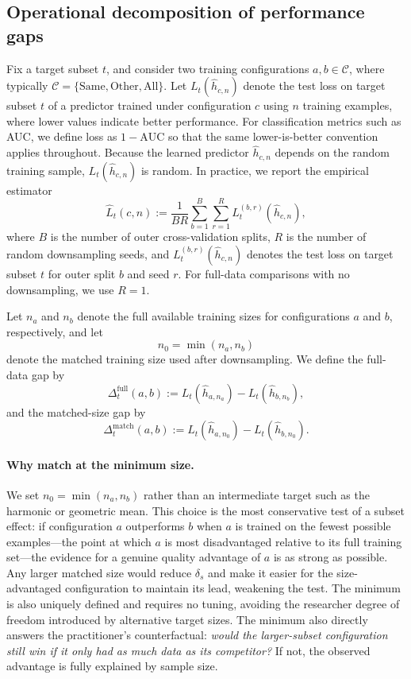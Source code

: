 \documentclass{article}
\begin{document}
\subsection{Operational decomposition of performance gaps}
Fix a target subset $t$, and consider two training configurations $a,b \in \mathcal C$, where typically
$\mathcal C=\{\mathrm{Same},\mathrm{Other},\mathrm{All}\}$.
Let $L_t(\hat h_{c,n})$ denote the test loss on target subset $t$ of a predictor trained under configuration $c$ using $n$ training examples, where lower values indicate better performance.
For classification metrics such as AUC, we define loss as $1-\mathrm{AUC}$ so that the same lower-is-better convention applies throughout.
Because the learned predictor $\hat h_{c,n}$ depends on the random training sample, $L_t(\hat h_{c,n})$ is random.
In practice, we report the empirical estimator
\begin{equation}
\widehat{L}_t(c,n)
:=
\frac{1}{BR}\sum_{b=1}^B \sum_{r=1}^R L_t^{(b,r)}(\hat h_{c,n}),
\label{eq:empirical-loss}
\end{equation}
where $B$ is the number of outer cross-validation splits, $R$ is the number of random downsampling seeds, and $L_t^{(b,r)}(\hat h_{c,n})$ denotes the test loss on target subset $t$ for outer split $b$ and seed $r$.
For full-data comparisons with no downsampling, we use $R=1$.

Let $n_a$ and $n_b$ denote the full available training sizes for configurations $a$ and $b$, respectively, and let
\[
n_0 = \min(n_a,n_b)
\]
denote the matched training size used after downsampling.
We define the full-data gap by
\begin{equation}
\Delta_t^{\mathrm{full}}(a,b)
:=
L_t(\hat h_{a,n_a}) - L_t(\hat h_{b,n_b}),
\label{eq:full-gap}
\end{equation}
and the matched-size gap by
\begin{equation}
\Delta_t^{\mathrm{match}}(a,b)
:=
L_t(\hat h_{a,n_0}) - L_t(\hat h_{b,n_0}).
\label{eq:matched-gap}
\end{equation}

\paragraph{Why match at the minimum size.}
We set $n_0 = \min(n_a, n_b)$ rather than an intermediate target such as the harmonic or geometric mean.
This choice is the most conservative test of a subset effect: if configuration $a$ outperforms $b$ when $a$ is trained on the fewest possible examples---the point at which $a$ is most disadvantaged relative to its full training set---the evidence for a genuine quality advantage of $a$ is as strong as possible.
Any larger matched size would reduce $\delta_s$ and make it easier for the size-advantaged configuration to maintain its lead, weakening the test.
The minimum is also uniquely defined and requires no tuning, avoiding the researcher degree of freedom introduced by alternative target sizes.
The minimum also directly answers the practitioner's counterfactual: \emph{would the larger-subset configuration still win if it only had as much data as its competitor?}
If not, the observed advantage is fully explained by sample size.
\end{document}
